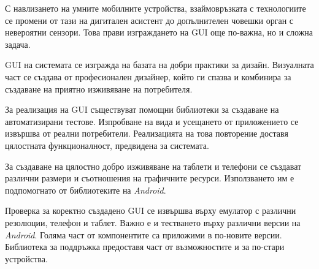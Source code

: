		С навлизането на умните мобилните устройства, взаймовръзката с технологиите се промени от тази на дигитален асистент до допълнителен човешки орган с невероятни сензори.\cite{Nudelman} Това прави изграждането на \ac{GUI} още по-важна, но и сложна задача.
		
		\ac{GUI} на системата се изгражда на базата на добри практики за дизайн. Визуалната част се създава от професионален дизайнер, който ги спазва и комбинира за създаване на приятно изживяване на потребителя.
		
		За реализация на \ac{GUI} съществуват помощни библиотеки за създаване на автоматизирани тестове. Изпробване на вида и усещането от приложението се извършва от реални потребители. Реализацията на това повторение доставя цялостната функционалност, предвидена за системата.
		
		За създаване на цялостно добро изживяване на таблети и телефони се създават различни размери и съотношения на графичните ресурси. Използването им е подпомогнато от библиотеките на \emph{Android}.
		
		Проверка за коректно създадено \ac{GUI} се извършва върху емулатор с различни резолюции, телефон и таблет. Важно е и тестването върху различни версии на \emph{Android}. Голяма част от компонентите са приложими в по-новите версии. Библиотека за поддръжка предоставя част от възможностите и за по-стари устройства.
		
		
		
		